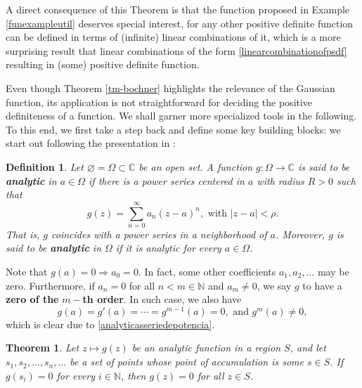 \documentclass[12pt]{report} %
\newtheorem{definition}{Definition}
\newtheorem{theorem}{Theorem}
\newcommand{\tmstrong}[1]{\textbf{#1}}
\begin{document}
A direct consequence of this Theorem is that the function proposed in Example
\ref{funexampleutil} deserves special interest, for any other positive
definite function can be defined in terms of (infinite) linear combinations of
it, which is a more surprising result that linear combinations of the form
\eqref{linearcombinationofpsdf} resulting in (some) positive definite
function.

Even though Theorem \ref{tm-bochner} highlights the relevance
of the Gaussian function, its application is not straightforward
for deciding the positive definiteness of a function.
We shall garner more specialized tools in the following.
To this end, we first take a step back and define some key building blocks: we
start out following the presentation in {\cite{titchmarsh1939theory}}:

\begin{definition}
  Let $\varnothing = \Omega \subset \mathbb{C}$ be an open set. A function $g
    : \Omega \rightarrow \mathbb{C}$ is said to be {\tmstrong{analytic}} in $a
    \in \Omega$ if there is a power series centered in $a$ with radius $R > 0$
  such that
  \begin{equation}
    g (z) = \sum_{n = 0}^{\infty} a_n (z - a)^n
    \label{analyticasseriedepotencia}, \text{ with } | z - a | < \rho .
  \end{equation}
  That is, $g$ coincides with a power series in a neighborhood of $a$.
  Moreover, $g$ is said to be {\tmstrong{analytic}} in $\Omega$ if it is
  analytic for every $a \in \Omega$.
\end{definition}

Note that $g (a) = 0 \Rightarrow a_0 = 0$. In fact, some other coefficients
$a_1, a_2, \ldots$ may be zero. Furthermore, if $a_n = 0$ for all $n < m \in
  \mathbb{N}$ and $a_m \neq 0$, we say $g$ to have a {\tmstrong{zero of the}} $m
  -${\tmstrong{th order}}. In such case, we also have
\[ g (a) = g' (a) = \cdots = g^{m - 1} (a) = 0, \text{ and } g^m (a) \neq 0,
\]
which is clear due to \eqref{analyticasseriedepotencia}.

\begin{theorem}
  \label{theorem-titschmarch}Let $z \mapsto g (z)$ be an analytic function in
  a region $S$, and let $s_1, s_2, \ldots, s_n, \ldots$ be a set of points
  whose point of accumulation is some $s \in S$. If $g (s_i) = 0$ for every $i
    \in \mathbb{N}$, then $g (z) = 0$ for all $z \in S$.
\end{theorem}
\end{document}
